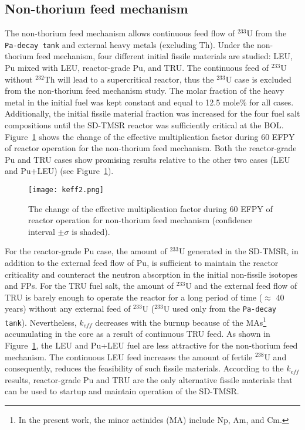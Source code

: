 \subsection{Non-thorium feed mechanism}

The non-thorium feed mechanism allows continuous feed flow of 
$^{233}$U from the \texttt{Pa-decay tank} and external heavy metals (excluding Th). 
Under the non-thorium feed mechanism, four different initial fissile materials are studied: \gls{LEU}, Pu mixed with \gls{LEU}, reactor-grade Pu, and \gls{TRU}. The continuous feed of $^{233}$U 
without $^{232}$Th will lead to a supercritical reactor, thus the $^{233}$U case 
is excluded from the non-thorium feed mechanism study.
The molar fraction of the heavy metal in the initial fuel was kept constant and equal to 12.5 mole\% for all cases. 
Additionally, the initial fissile material fraction was increased for the four fuel 
salt compositions until the \gls{SD-TMSR} reactor was sufficiently critical at 
the BOL. 
Figure~\ref{fig:keff2} shows the change of the effective multiplication factor 
during 60 \gls{EFPY} of reactor operation for the non-thorium feed mechanism. Both the reactor-grade Pu and TRU cases 
show promising results relative to the other two cases (LEU and Pu+LEU) (see Figure~\ref{fig:keff2}). 
\begin{figure}
	\centering
	\texttt{[image: keff2.png]}
			\vspace{-0.5in}
	\caption{The change of the effective multiplication factor during 60 
	\gls{EFPY} of reactor operation for non-thorium feed mechanism (confidence 
	interval $\pm\sigma$ is shaded).} 
	\label{fig:keff2}
\end{figure}

For the reactor-grade Pu case, the amount of $^{233}$U generated in the \gls{SD-TMSR}, in addition to the external feed flow of Pu, is sufficient to maintain the reactor criticality and counteract the neutron absorption in the initial non-fissile isotopes and FPs. 
For the \gls{TRU} fuel salt, the amount of 
$^{233}$U and the external feed flow of TRU is barely enough to operate the 
reactor for a long period of time ($\approx$ $40$ years) without any 
external feed of $^{233}$U ($^{233}$U used only from the \texttt{Pa-decay tank}). Nevertheless, $k_{eff}$ decreases with the burnup 
because of the \glspl{MA}\footnote{In the present work, the minor actinides 
(MA) include Np, Am, and Cm.} accumulating in the core as a result of 
continuous TRU feed. As shown in Figure~\ref{fig:keff2}, the LEU and Pu+LEU 
fuel are less attractive for the non-thorium feed mechanism. The continuous LEU 
feed increases the amount of fertile $^{238}$U and consequently, reduces the 
feasibility of such fissile materials. According to the $k_{eff}$ 
results, reactor-grade Pu and TRU are the only alternative fissile materials that  
can be used to startup and maintain operation of the \gls{SD-TMSR}.

